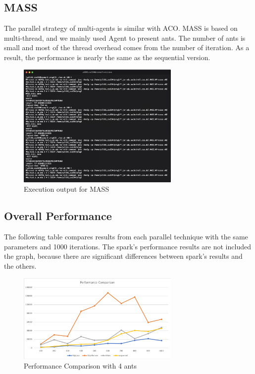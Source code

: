 \documentclass[11pt, letterpaper]{article}
\begin{document}
	\subsection{MASS}
	The parallel strategy of multi-agents is similar with ACO. MASS is based on multi-thread, and we mainly used Agent to present ants. The number of ants is small and most of the thread overhead comes from the number of iteration. As a result, the performance is nearly the same as the sequential version.
	
	\begin{figure}[H]
		\centering
		\includegraphics[width=0.7\textwidth]{massper}
		\caption{Execution output for MASS}
	\end{figure}
	
	\subsection{Overall Performance}
	The following table compares results from each parallel technique with the same parameters and 1000 iterations.	The spark's performance results are not included the graph, because there are significant differences between spark's results and the others. 
	\begin{figure}[H]
		\centering
		\includegraphics[width=0.7\textwidth]{perfo}
		\caption{Performance Comparison with 4 ants}
	\end{figure}
\end{document}
